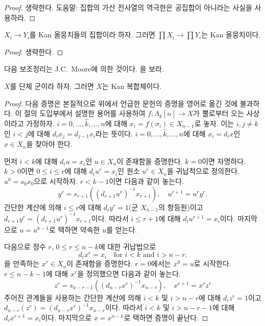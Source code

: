 \begin{proof}
생략한다. 도움말: 집합의 가산 전사열의 역극한은 공집합이 아니라는
사실을 사용하라.
\end{proof}

\begin{lemma}
\label{lemma-product-kan}
$X_i \to Y_i$를 Kan 올뭉치들의 집합이라 하자. 그러면
$\prod X_i \to \prod Y_i$는 Kan 올뭉치이다.
\end{lemma}

\begin{proof}
생략한다.
\end{proof}
\noindent
다음 보조정리는 J.C.\ Moore에 의한 것이다. \cite{Moore-Cartan}을 보라.

\begin{lemma}
\label{lemma-simplicial-group-kan}
$X$를 단체 군이라 하자. 그러면 $X$는 Kan 복합체이다.
\end{lemma}

\begin{proof}
다음 증명은 본질적으로 위에서 언급한 문헌의 증명을 영어로 옮긴 것에
불과하다. 이 절의 도입부에서 설명한 용어를 사용하여
$f : \Lambda_k[n] \to X$가 뿔로부터 오는 사상이라고 가정하자.
$i = 0, \ldots, \hat k, \ldots, n$에 대해
$x_i = f(\sigma_i) \in X_{n - 1}$로 놓자. 이는 $i, j \not = k$인
$i < j$에 대해 $d_i x_j = d_{j - 1} x_i$라는 뜻이다.
$i = 0, \ldots, \hat k, \ldots, n$에 대해 $x_i = d_ix$인
$x \in X_n$을 찾아야 한다.

\medskip\noindent
먼저 $i < k$에 대해 $d_i u = x_i$인 $u \in X_n$이 존재함을
증명한다. $k = 0$이면 자명하다. $k > 0$이면 $0 \leq i \leq r$에
대해 $d_i u^r = x_i$인 원소 $u^r \in X_n$을 귀납적으로 정의한다.
$u^0 = s_0x_0$으로 시작하자. $r < k - 1$이면 다음과 같이 놓는다.
$$
y^r = s_{r + 1}((d_{r + 1}u^r)^{-1}x_{r + 1}),\quad
u^{r + 1} = u^r y^r.
$$
간단한 계산에 의해 $i \leq r$에 대해 $d_iy^r = 1$(군
$X_{n - 1}$의 항등원)이고
$d_{r + 1}y^r = (d_{r + 1}u^r)^{-1}x_{r + 1}$이다. 따라서
$i \leq r + 1$에 대해 $d_iu^{r + 1} = x_i$이다. 마지막으로
$u = u^{k - 1}$로 택하면 약속한 $u$를 얻는다.

\medskip\noindent
다음으로 정수 $r$, $0 \leq r \leq n - k$에 대한 귀납법으로
$$
d_i x^r = x_i\quad\text{for }i < k\text{ and }i > n - r.
$$
을 만족하는 $x^r \in X_n$이 존재함을 증명한다. $r = 0$에서는
$x^0 = u$로 시작한다. $r \leq n - k - 1$에 대해 $x^r$을 정의했으면
다음과 같이 놓는다.
$$
z^r = s_{n - r - 1}((d_{n - r}x^r)^{-1}x_{n - r}),\quad x^{r + 1} = x^rz^r
$$
주어진 관계들을 사용하는 간단한 계산에 의해 $i < k$ 및
$i > n - r$에 대해 $d_iz^r = 1$이고
$d_{n - r}(z^r) = (d_{n - r}x^r)^{-1}x_{n - r}$이다. 따라서
$i < k$ 및 $i > n - r - 1$에 대해 $d_ix^{r + 1} = x_i$이다.
마지막으로 $x = x^{n - k}$로 택하면 증명이 끝난다.
\end{proof}


